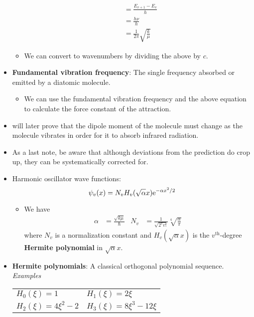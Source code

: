 \documentclass[../notes.tex]{subfiles}
\begin{document}
\begin{itemize}
\begin{itemize}
\begin{align*}
            &= \frac{E_{v+1}-E_v}{h}\\
            &= \frac{h\nu}{h}\\
            &= \frac{1}{2\pi}\sqrt{\frac{k}{\mu}}
        \end{align*}
        \item We can convert to wavenumbers by dividing the above by $c$.
    \end{itemize}
    \item \textbf{Fundamental vibration frequency}: The single frequency absorbed or emitted by a diatomic molecule.
    \begin{itemize}
        \item We can use the fundamental vibration frequency and the above equation to calculate the force constant of the attraction.
    \end{itemize}
    \item \textcite{bib:McQuarrieSimon} will later prove that the dipole moment of the molecule must change as the molecule vibrates in order for it to absorb infrared radiation.
    \item As a last note, be aware that although deviations from the prediction do crop up, they can be systematically corrected for.
    \item Harmonic oscillator wave functions:
    \begin{equation*}
        \psi_v(x) = N_vH_v(\sqrt{\alpha}x)\e[-\alpha x^2/2]
    \end{equation*}
    \begin{itemize}
        \item We have
        \begin{align*}
            \alpha &= \frac{\sqrt{k\mu}}{\hbar}&
            N_v &= \frac{1}{\sqrt{2^vv!}}\sqrt[4]{\frac{\alpha}{\pi}}
        \end{align*}
        where $N_v$ is a normalization constant and $H_v(\sqrt{\alpha}x)$ is the $v^\text{th}$-degree \textbf{Hermite polynomial} in $\sqrt{\alpha}x$.
    \end{itemize}
    \item \textbf{Hermite polynomials}: A classical orthogonal polynomial sequence. \emph{Examples}
    \begin{table}[h!]
        \centering
        \small
        \renewcommand{\arraystretch}{1.2}
        \begin{tabular}{ll}
            \toprule
            $H_0(\xi)=1$ & $H_1(\xi)=2\xi$\\
            $H_2(\xi)=4\xi^2-2$ & $H_3(\xi)=8\xi^3-12\xi$\\

\end{tabular}
\end{table}
\end{itemize}
\end{document}
